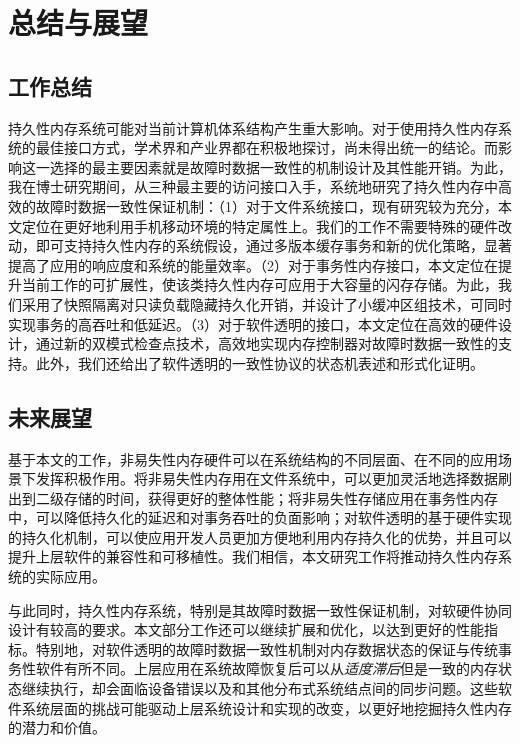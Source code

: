 \chapter{总结与展望}
\label{chap:conclusion}

\section{工作总结}

持久性内存系统可能对当前计算机体系结构产生重大影响。对于使用持久性内存系统的最佳接口方式，学术界和产业界都在积极地探讨，尚未得出统一的结论。而影响这一选择的最主要因素就是故障时数据一致性的机制设计及其性能开销。为此，我在博士研究期间，从三种最主要的访问接口入手，系统地研究了持久性内存中高效的故障时数据一致性保证机制：（1）对于文件系统接口，现有研究较为充分，本文定位在更好地利用手机移动环境的特定属性上。我们的工作不需要特殊的硬件改动，即可支持持久性内存的系统假设，通过多版本缓存事务和新的优化策略，显著提高了应用的响应度和系统的能量效率。（2）对于事务性内存接口，本文定位在提升当前工作的可扩展性，使该类持久性内存可应用于大容量的闪存存储。为此，我们采用了快照隔离对只读负载隐藏持久化开销，并设计了小缓冲区组技术，可同时实现事务的高吞吐和低延迟。（3）对于软件透明的接口，本文定位在高效的硬件设计，通过新的双模式检查点技术，高效地实现内存控制器对故障时数据一致性的支持。此外，我们还给出了软件透明的一致性协议的状态机表述和形式化证明。

\section{未来展望}

基于本文的工作，非易失性内存硬件可以在系统结构的不同层面、在不同的应用场景下发挥积极作用。将非易失性内存用在文件系统中，可以更加灵活地选择数据刷出到二级存储的时间，获得更好的整体性能；将非易失性存储应用在事务性内存中，可以降低持久化的延迟和对事务吞吐的负面影响；对软件透明的基于硬件实现的持久化机制，可以使应用开发人员更加方便地利用内存持久化的优势，并且可以提升上层软件的兼容性和可移植性。我们相信，本文研究工作将推动持久性内存系统的实际应用。

与此同时，持久性内存系统，特别是其故障时数据一致性保证机制，对软硬件协同设计有较高的要求。本文部分工作还可以继续扩展和优化，以达到更好的性能指标。特别地，对软件透明的故障时数据一致性机制对内存数据状态的保证与传统事务性软件有所不同。上层应用在系统故障恢复后可以从\emph{适度滞后}但是一致的内存状态继续执行，却会面临设备错误以及和其他分布式系统结点间的同步问题。这些软件系统层面的挑战可能驱动上层系统设计和实现的改变，以更好地挖掘持久性内存的潜力和价值。

